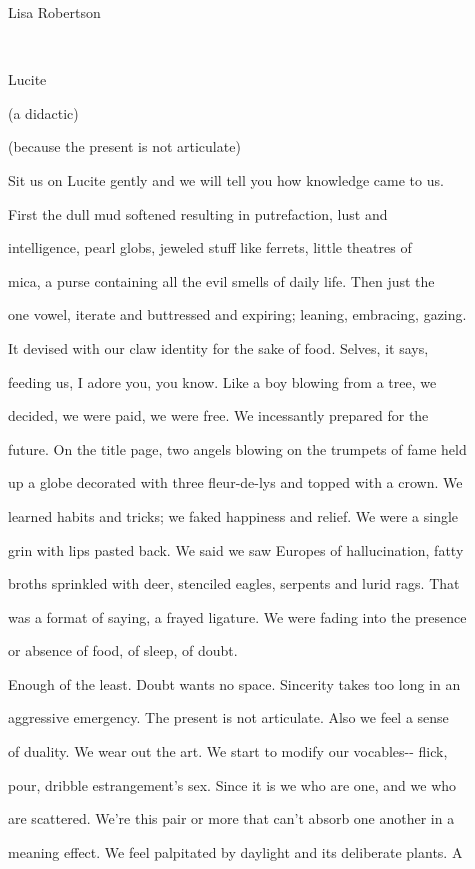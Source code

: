 Lisa Robertson

~

Lucite

(a didactic)

(because the present is not articulate)

Sit us on Lucite gently and we will tell you how knowledge came to us.

First the dull mud softened resulting in putrefaction, lust and

intelligence, pearl globs, jeweled stuff like ferrets, little theatres
of

mica, a purse containing all the evil smells of daily life. Then just
the

one vowel, iterate and buttressed and expiring; leaning, embracing,
gazing.

It devised with our claw identity for the sake of food. Selves, it says,

feeding us, I adore you, you know. Like a boy blowing from a tree, we

decided, we were paid, we were free. We incessantly prepared for the

future. On the title page, two angels blowing on the trumpets of fame
held

up a globe decorated with three fleur-de-lys and topped with a crown. We

learned habits and tricks; we faked happiness and relief. We were a
single

grin with lips pasted back. We said we saw Europes of hallucination,
fatty

broths sprinkled with deer, stenciled eagles, serpents and lurid rags.
That

was a format of saying, a frayed ligature. We were fading into the
presence

or absence of food, of sleep, of doubt.

Enough of the least. Doubt wants no space. Sincerity takes too long in
an

aggressive emergency. The present is not articulate. Also we feel a
sense

of duality. We wear out the art. We start to modify our vocables-\/-
flick,

pour, dribble estrangement's sex. Since it is we who are one, and we who

are scattered. We're this pair or more that can't absorb one another in
a

meaning effect. We feel palpitated by daylight and its deliberate
plants. A

